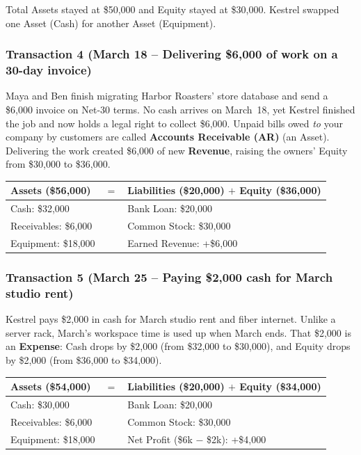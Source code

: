 Total Assets stayed at \$50,000 and Equity stayed at \$30,000. Kestrel swapped one Asset (Cash) for another Asset (Equipment).

\subsubsection*{Transaction 4 (March 18 -- Delivering \$6,000 of work on a 30-day invoice)}
Maya and Ben finish migrating Harbor Roasters' store database and send a \$6,000 invoice on Net-30 terms. No cash arrives on March~18, yet Kestrel finished the job and now holds a legal right to collect \$6,000. Unpaid bills owed \emph{to} your company by customers are called \textbf{Accounts Receivable (AR)} (an Asset). Delivering the work created \$6,000 of new \textbf{Revenue}, raising the owners' Equity from \$30,000 to \$36,000.

\begin{center}
\small
\begin{tabular}{@{}lcl@{}}
\toprule
\textbf{Assets (\$56,000)} & $=$ & \textbf{Liabilities (\$20,000) $+$ Equity (\$36,000)} \\
\midrule
Cash: \$32,000        & & Bank Loan: \$20,000 \\
Receivables: \$6,000  & & Common Stock: \$30,000 \\
Equipment: \$18,000   & & Earned Revenue: +\$6,000 \\
\bottomrule
\end{tabular}
\end{center}

\subsubsection*{Transaction 5 (March 25 -- Paying \$2,000 cash for March studio rent)}
Kestrel pays \$2,000 in cash for March studio rent and fiber internet. Unlike a server rack, March's workspace time is used up when March ends. That \$2,000 is an \textbf{Expense}: Cash drops by \$2,000 (from \$32,000 to \$30,000), and Equity drops by \$2,000 (from \$36,000 to \$34,000).

\begin{center}
\small
\begin{tabular}{@{}lcl@{}}
\toprule
\textbf{Assets (\$54,000)} & $=$ & \textbf{Liabilities (\$20,000) $+$ Equity (\$34,000)} \\
\midrule
Cash: \$30,000        & & Bank Loan: \$20,000 \\
Receivables: \$6,000  & & Common Stock: \$30,000 \\
Equipment: \$18,000   & & Net Profit (\$6k $-$ \$2k): +\$4,000 \\
\bottomrule
\end{tabular}
\end{center}

